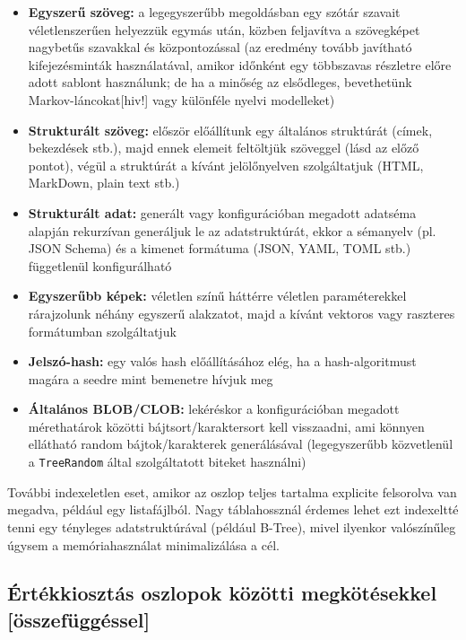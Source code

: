 \documentclass[
    parspace,
    noindent,
    nohyp,
]{elteiktdk}[2023/04/10]
\begin{document}
\begin{itemize}
  \item \textbf{Egyszerű szöveg:}
    a legegyszerűbb megoldásban egy szótár szavait véletlenszerűen helyezzük egymás után,
    közben feljavítva a szövegképet nagybetűs szavakkal és központozással
    (az eredmény tovább javítható kifejezésminták használatával,
    amikor időnként egy többszavas részletre előre adott sablont használunk;
    de ha a minőség az elsődleges, bevethetünk Markov-láncokat[hiv!] vagy különféle nyelvi modelleket)
  \item \textbf{Strukturált szöveg:}
    először előállítunk egy általános struktúrát (címek, bekezdések stb.),
    majd ennek elemeit feltöltjük szöveggel (lásd az előző pontot),
    végül a struktúrát a kívánt jelölőnyelven szolgáltatjuk (HTML, MarkDown, plain text stb.)
  \item \textbf{Strukturált adat:}
    generált vagy konfigurációban megadott adatséma alapján rekurzívan generáljuk le az adatstruktúrát,
    ekkor a sémanyelv (pl. JSON Schema) és a kimenet formátuma (JSON, YAML, TOML stb.)
    függetlenül konfigurálható
  \item \textbf{Egyszerűbb képek:}
    véletlen színű háttérre véletlen paraméterekkel
    rárajzolunk néhány egyszerű alakzatot,
    majd a kívánt vektoros vagy raszteres formátumban szolgáltatjuk
  \item \textbf{Jelszó-hash:}
    egy valós hash előállításához elég, ha a hash-algoritmust magára a seedre mint bemenetre hívjuk meg
  \item \textbf{Általános BLOB/CLOB:}
    lekéréskor a konfigurációban megadott mérethatárok közötti bájtsort/karaktersort kell visszaadni,
    ami könnyen ellátható random bájtok/karakterek generálásával
    (legegyszerűbb közvetlenül a \texttt{TreeRandom} által szolgáltatott biteket használni)
\end{itemize}

További indexeletlen eset, amikor az oszlop teljes tartalma explicite felsorolva van megadva,
például egy listafájlból.
Nagy táblahossznál érdemes lehet ezt indexeltté tenni egy tényleges adatstruktúrával (például B-Tree),
mivel ilyenkor valószínűleg úgysem a memóriahasználat minimalizálása a cél.

\subsection{Értékkiosztás oszlopok közötti megkötésekkel [összefüggéssel]}
\end{document}
